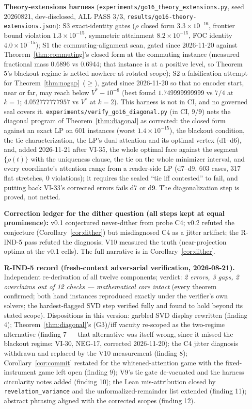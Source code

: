 \documentclass[11pt]{article}
\theoremstyle{definition}
\begin{document}
\textbf{Theory-extensions harness}
(\texttt{experiments/go16\_theory\_extensions.py}, seed 20260821,
dev-disclosed, ALL PASS 3/3,
\texttt{results/go16-theory-extensions.json}): S3 exact-identity
gates ($\rho$ closed form $3.3\times10^{-16}$, frontier bound
violation $1.3\times10^{-15}$, symmetric attainment
$8.2\times10^{-15}$, FOC identity $4.0\times10^{-15}$); S1 the
commuting-alignment scan, gated since 2026-11-20 against
Theorem~\ref{thm:commuting}'s closed form at the commuting instance
(measured fractional mass $0.6896$ vs $0.6944$; that instance is at a
positive level, so Theorem 5's blackout regime is netted nowhere at
rotated scope); S2 a falsification attempt for
Theorem~\ref{thm:nogap}~($\ge$), gated since 2026-11-20 so that no
encoder start, near or far, may reach below $V^\ast-10^{-8}$ (best found
$1.749999999999$ vs $7/4$ at $k=1$; $4.052777777957$ vs $V^\ast$ at
$k=2$). This harness is not in CI, and no governed seal covers it.
\texttt{experiments/verify\_go16\_diagonal.py} (in CI, 9/9) nets the
diagonal program of Theorem~\ref{thm:diagonal} as corrected: the closed
form against an exact LP on 601 instances (worst $1.4\times10^{-15}$),
the blackout condition, the tie characterization, the LP's dual
attention and its optimal vertex (d1--d6), and, added 2026-11-21 after
VI-35, the whole optimal face against the segment $\{\rho(t)\}$ with the
uniqueness clause, the tie on the whole minimizer interval, and every
coordinate's attention range from a reader-side LP (d7--d9, 603 cases,
317 flat stretches, 0 violations); it requires the sealed ``tie iff
contested'' to fail, and putting back VI-33's corrected errors fails
d7 or d9. The diagonalization step is proved, not netted.

\textbf{Correction ledger for the dither question (all steps kept at
equal prominence):} v0.1 conjectured never-dither from probe C4;
v0.2 refuted the conjecture (Corollary~\ref{cor:dither}) but
misdiagnosed C4 as a jitter artifact; the R-IND-5 pass refuted the
diagnosis; V10 measured the truth (near-projection optima at the
v0.1 cells). The full narrative is in
Corollary~\ref{cor:dither}.

\textbf{R-IND-5 record (fresh-context adversarial verification,
2026-08-21).} Independent re-derivation of all twelve components;
verdict: \emph{2 errors, 3 gaps, 2 overclaims out of 12 checks ---
mathematical core intact} (every theorem confirmed; both hand
instances reproduced exactly under the verifier's own solvers; the
hardest-flagged SVD step verified fully and found to hold beyond its
stated scope). Dispositions in this version: garbled SVD display
rewritten (finding 4); Theorem~\ref{thm:diagonal}'s (G3)/iff
vacuity re-scoped as the two-regime alternative (finding 7 --- that
alternative was itself wrong, since it missed the blackout regime:
VI-30, NEG-17, corrected 2026-11-20); the C4
jitter diagnosis withdrawn and replaced by the V10 measurement
(finding 8); Corollary~\ref{cor:commit} restated for the
whitened-attention game with the fixed-instrument game left open
(finding 9); V9's tie gate de-vacuated and the harness circularity
notes added (finding 10); the Lean mis-attribution closed by
\texttt{revelation\_variance} and the unformalized-remainder list
extended (finding 11); abstract phrasing aligned with the corrected
scopes (finding 12).
\end{document}
